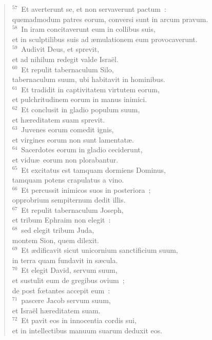 \begin{verse}
${}^{57}$~Et averterunt se, et non servaverunt pactum~:\\ quemadmodum patres eorum, conversi sunt in arcum pravum.\\
${}^{58}$~In iram concitaverunt eum in collibus suis,\\ et in sculptilibus suis ad \ae mulationem eum provocaverunt.\\
${}^{59}$~Audivit Deus, et sprevit,\\ et ad nihilum redegit valde Isra\"el.\\
${}^{60}$~Et repulit tabernaculum Silo,\\ tabernaculum suum, ubi habitavit in hominibus.\\
${}^{61}$~Et tradidit in captivitatem virtutem eorum,\\ et pulchritudinem eorum in manus inimici.\\
${}^{62}$~Et conclusit in gladio populum suum,\\ et h\ae reditatem suam sprevit.\\
${}^{63}$~Juvenes eorum comedit ignis,\\ et virgines eorum non sunt lamentat\ae .\\
${}^{64}$~Sacerdotes eorum in gladio ceciderunt,\\ et vidu\ae\ eorum non plorabantur.\\
${}^{65}$~Et excitatus est tamquam dormiens Dominus,\\ tamquam potens crapulatus a vino.\\
${}^{66}$~Et percussit inimicos suos in posteriora~;\\ opprobrium sempiternum dedit illis.\\
${}^{67}$~Et repulit tabernaculum Joseph,\\ et tribum Ephraim non elegit~:\\
${}^{68}$~sed elegit tribum Juda,\\ montem Sion, quem dilexit.\\
${}^{69}$~Et \ae dificavit sicut unicornium sanctificium suum,\\ in terra quam fundavit in s\ae cula.\\
${}^{70}$~Et elegit David, servum suum,\\ et sustulit eum de gregibus ovium~;\\ de post fœtantes accepit eum~:\\
${}^{71}$~pascere Jacob servum suum,\\ et Isra\"el h\ae reditatem suam.\\
${}^{72}$~Et pavit eos in innocentia cordis sui,\\ et in intellectibus manuum suarum deduxit eos.\end{verse}



